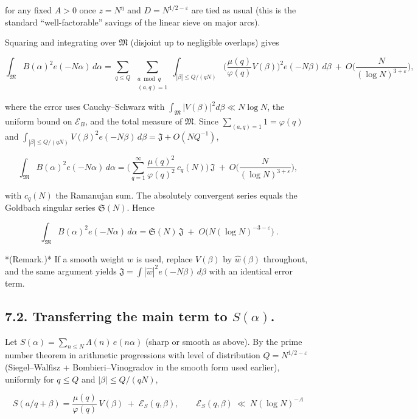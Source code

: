 \documentclass[11pt]{article}
\theoremstyle{definition}
\theoremstyle{remark}
\begin{document}
for any fixed $A>0$ once $z=N^\eta$ and $D=N^{1/2-\varepsilon}$ are tied as usual (this is the standard “well-factorable” savings of the linear sieve on major arcs).

Squaring and integrating over $\mathfrak M$ (disjoint up to negligible overlaps) gives

$$
\int_{\mathfrak M} B(\alpha)^2 e(-N\alpha)\,d\alpha
= \sum_{q\le Q}\ \sum_{\substack{a\bmod q\\(a,q)=1}}
\int_{|\beta|\le Q/(qN)} 
\Big(\frac{\mu(q)}{\varphi(q)}V(\beta)\Big)^{\!2} e(-N\beta)\,d\beta
\ +\ O\!\Big(\frac{N}{(\log N)^{3+\varepsilon}}\Big),
$$

where the error uses Cauchy–Schwarz with $\int_{\mathfrak M}|V(\beta)|^2 d\beta\ll N\log N$, the uniform bound on $\mathcal E_B$, and the total measure of $\mathfrak M$.
Since $\sum_{(a,q)=1}1=\varphi(q)$ and $\int_{|\beta|\le Q/(qN)}V(\beta)^2 e(-N\beta)\,d\beta=\mathfrak J+O(NQ^{-1})$,

$$
\int_{\mathfrak M} B(\alpha)^2 e(-N\alpha)\,d\alpha
= \Big(\sum_{q=1}^{\infty}\frac{\mu(q)^2}{\varphi(q)^2}\,c_q(N)\Big)\,\mathfrak J
\ +\ O\!\Big(\frac{N}{(\log N)^{3+\varepsilon}}\Big),
$$

with $c_q(N)$ the Ramanujan sum. The absolutely convergent series equals the Goldbach singular series $\mathfrak S(N)$. Hence

$$
\boxed{\ \ \int_{\mathfrak M} B(\alpha)^2 e(-N\alpha)\,d\alpha
=\mathfrak S(N)\,\mathfrak J\;+\;O\!\big(N(\log N)^{-3-\varepsilon}\big)\ .\ }
$$

*(Remark.)* If a smooth weight $w$ is used, replace $V(\beta)$ by $\widehat w(\beta)$ throughout, and the same argument yields $\mathfrak J=\int|\widehat w|^2 e(-N\beta)\,d\beta$ with an identical error term.

\subsection*{7.2. Transferring the main term to $S(\alpha)$.}

Let $S(\alpha)=\sum_{n\le N}\Lambda(n)\,e(n\alpha)$ (sharp or smooth as above). By the prime number theorem in arithmetic progressions with level of distribution $Q=N^{1/2-\varepsilon}$ (Siegel–Walfisz + Bombieri–Vinogradov in the smooth form used earlier), uniformly for $q\le Q$ and $|\beta|\le Q/(qN)$,

$$
S(a/q+\beta)=\frac{\mu(q)}{\varphi(q)}\,V(\beta) \;+\; \mathcal E_S(q,\beta),
\qquad \mathcal E_S(q,\beta)\ \ll\ N(\log N)^{-A}
$$
\end{document}
